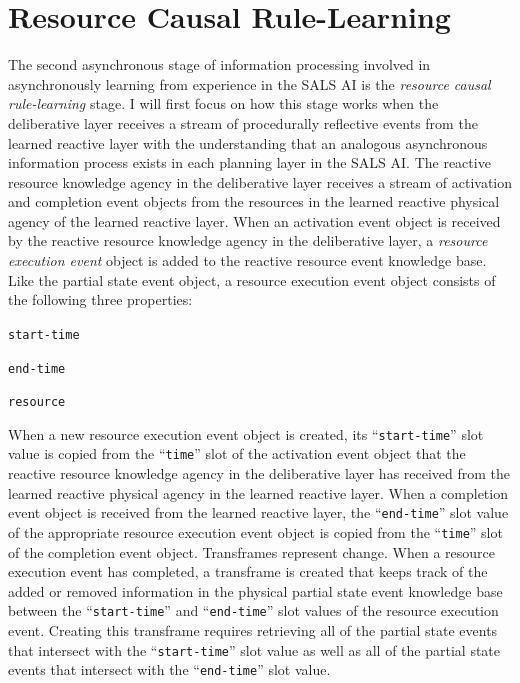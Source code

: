 \section{Resource Causal Rule-Learning}
\label{section:resource_execution_event_causal_rule_learning}

The second asynchronous stage of information processing involved in
asynchronously learning from experience in the SALS AI is the
{\emph{resource causal rule-learning}} stage.  I will first focus on
how this stage works when the deliberative layer receives a stream of
procedurally reflective events from the learned reactive layer with
the understanding that an analogous asynchronous information process
exists in each planning layer in the SALS AI.  The reactive resource
knowledge agency in the deliberative layer receives a stream of
activation and completion event objects from the resources in the
learned reactive physical agency of the learned reactive layer.  When
an activation event object is received by the reactive resource
knowledge agency in the deliberative layer, a {\emph{resource
    execution event}} object is added to the reactive resource event
knowledge base.  Like the partial state event object, a resource
execution event object consists of the following three properties:
\begin{packed_enumerate}
\item{{\tt{start-time}}}
\item{{\tt{end-time}}}
\item{{\tt{resource}}}
\end{packed_enumerate}
When a new resource execution event object is created, its
``{\tt{start-time}}'' slot value is copied from the ``{\tt{time}}''
slot of the activation event object that the reactive resource
knowledge agency in the deliberative layer has received from the
learned reactive physical agency in the learned reactive layer.  When
a completion event object is received from the learned reactive layer,
the ``{\tt{end-time}}'' slot value of the appropriate resource
execution event object is copied from the ``{\tt{time}}'' slot of the
completion event object.  Transframes \cite[]{minsky:1975} represent
change.  When a resource execution event has completed, a transframe
is created that keeps track of the added or removed information in
the physical partial state event knowledge base between the
``{\tt{start-time}}'' and ``{\tt{end-time}}'' slot values of the
resource execution event.  Creating this transframe requires
retrieving all of the partial state events that intersect with the
``{\tt{start-time}}'' slot value as well as all of the partial state
events that intersect with the ``{\tt{end-time}}'' slot value.

